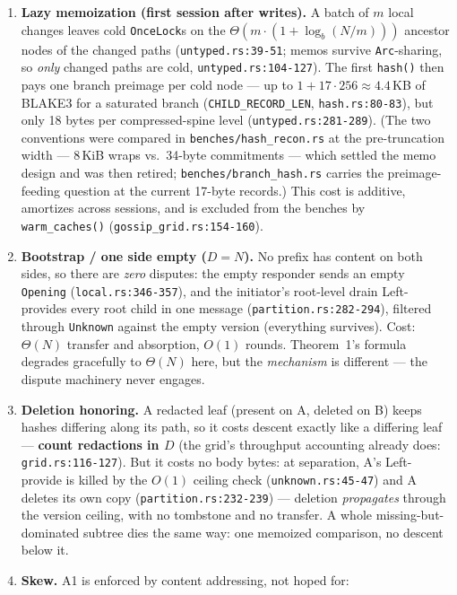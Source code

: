 \documentclass[11pt]{article}
\newcommand{\code}[1]{\texttt{#1}}
\theoremstyle{plain}
\begin{document}
\begin{enumerate}
\item \textbf{Lazy memoization (first session after writes).} A batch of
  $m$ local changes leaves cold \code{OnceLock}s on the
  $\Theta(m \cdot (1 + \log_b(N/m)))$ ancestor nodes of the changed paths
  (\code{untyped.rs:39-51}; memos survive \code{Arc}-sharing, so
  \emph{only} changed paths are cold, \code{untyped.rs:104-127}). The
  first \code{hash()} then pays one branch preimage per cold node --- up
  to $1 + 17 \cdot 256 \approx 4.4$\,KB of BLAKE3 for a saturated branch
  (\code{CHILD\_RECORD\_LEN}, \code{hash.rs:80-83}),
  but only 18 bytes per compressed-spine level (\code{untyped.rs:281-289}).
  (The two conventions were compared in \code{benches/hash\_recon.rs} at
  the pre-truncation width --- 8\,KiB wraps vs.\ 34-byte commitments ---
  which settled the memo design and was then retired;
  \code{benches/branch\_hash.rs} carries the preimage-feeding question at
  the current 17-byte records.) This cost
  is additive, amortizes across sessions, and is excluded from the benches
  by \code{warm\_caches()} (\code{gossip\_grid.rs:154-160}).
\item \textbf{Bootstrap / one side empty ($D = N$).} No prefix has content
  on both sides, so there are \emph{zero} disputes: the empty responder
  sends an empty \code{Opening} (\code{local.rs:346-357}), and the
  initiator's root-level drain Left-provides every root child in one
  message (\code{partition.rs:282-294}), filtered through \code{Unknown}
  against the empty version (everything survives). Cost: $\Theta(N)$
  transfer and absorption, $O(1)$ rounds. Theorem~1's formula degrades
  gracefully to $\Theta(N)$ here, but the \emph{mechanism} is different
  --- the dispute machinery never engages.
\item \textbf{Deletion honoring.} A redacted leaf (present on A, deleted
  on B) keeps hashes differing along its path, so it costs descent exactly
  like a differing leaf --- \textbf{count redactions in $D$} (the grid's
  throughput accounting already does: \code{grid.rs:116-127}). But it
  costs no body bytes: at separation, A's Left-provide is killed by the
  $O(1)$ ceiling check (\code{unknown.rs:45-47}) and A deletes its own
  copy (\code{partition.rs:232-239}) --- deletion \emph{propagates}
  through the version ceiling, with no tombstone and no transfer. A whole
  missing-but-dominated subtree dies the same way: one memoized
  comparison, no descent below it.
\item \textbf{Skew.} A1 is enforced by content addressing, not hoped for:

\end{enumerate}
\end{document}
